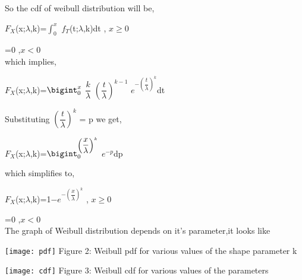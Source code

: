 \documentclass[12pt,a4paper,oneside]{article}
\begin{document}
\newline\newline
So the cdf of weibull distribution will be,\\
\begin{singlespace}
\hspace{5cm}$F_{X}$(x;${\lambda}$,k)=$ \int_{0}^{x}$ $f_{T}$(t;${\lambda}$,k)dt \hspace{1cm}, $x \geq 0$\\
\end{singlespace}
\hspace{6.7cm}=0 \hspace{3.3cm} ,$x < 0$\\
\newpage which implies,
\begin{singlespace}
\hspace{5cm}$F_{X}$(x;${\lambda}$,k)=$ \bigint_{0}^{x}$ $\dfrac{k}{{\lambda}}$ $\left(\dfrac{t}{\lambda}\right)^{k-1}$ $e^{-\left(\dfrac{t}{\lambda}\right)^{k}}$dt
\end{singlespace}
Substituting $\left(\dfrac{t}{\lambda}\right)^{k}$ = p we get,
\begin{singlespace}
\hspace{5cm}$F_{X}$(x;${\lambda}$,k)=$ \bigint_{0}^{\left(\dfrac{x}{\lambda}\right)^{k}}$ $e^{-p}$dp
\end{singlespace}\vspace{2cm}
which simplifies to,
\begin{singlespace}
\hspace{5cm}$F_{X}$(x;${\lambda}$,k)=1$-e^{-\left(\dfrac{x}{\lambda}\right)^{k}}$ \hspace{1cm}, $x \geq 0$\\
\end{singlespace}
\hspace{6.7cm}=0 \hspace{2.7cm} ,$x < 0$\\
\newline\newline
The graph of Weibull distribution depends on it's parameter,it looks like\\
\newline\newline
\begin{center}
\hspace{2cm}
\texttt{[image: pdf]}
\newline 
Figure 2: Weibull pdf for various values of the shape parameter k
\end{center}
\begin{center}
\hspace{2cm}
\texttt{[image: cdf]}
\newline 
Figure 3: Weibull cdf for various values of the parameters
\end{center}
\end{document}
